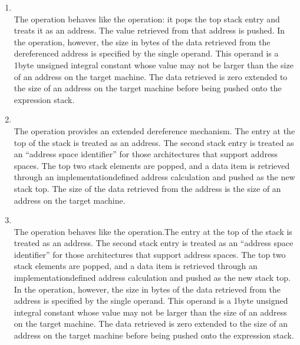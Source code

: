 \begin{enumerate}[1]
\item {} \\
The  operation behaves like the 
operation: it pops the top stack entry and treats it as an
address. The value retrieved from that address is pushed. In
the  operation, however, the size in bytes
of the data retrieved from the dereferenced address is
specified by the single operand. This operand is a 1\dash byte
unsigned integral constant whose value may not be larger
than the size of an address on the target machine. The data
retrieved is zero extended to the size of an address on the
target machine before being pushed onto the expression stack.

\item {} \\
The  operation provides an extended dereference
mechanism. The entry at the top of the stack is treated as an
address. The second stack entry is treated as an ``address
space identifier'' for those architectures that support
address spaces. The top two stack elements are popped,
and a data item is retrieved through an implementation\dash defined
address calculation and pushed as the new stack top. The size
of the data retrieved from the 
address is the
size of an address on the target machine.

\item {}\\
The  operation behaves like the
 operation.The entry at the top of the stack is
treated as an address. The second stack entry is treated as
an ``address space identifier'' for those architectures
that support 
address spaces. The top two stack
elements are popped, and a data item is retrieved through an
implementation\dash defined address calculation and pushed as the
new stack top. In the  operation, however,
the size in bytes of the data retrieved from the 
address is specified by the single operand. This operand is a
1\dash byte unsigned integral constant whose value may not be larger
than the size of an address on the target machine. The data
retrieved is zero extended to the size of an address on the
target machine before being pushed onto the expression stack.


\end{enumerate}
